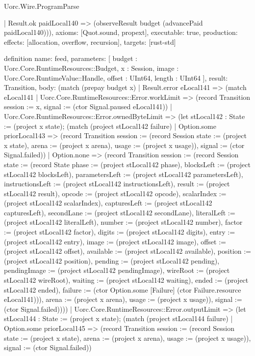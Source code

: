 \begin{lexlean}{Uorc.Wire.ProgramParse}
\begin{semanticmodule}
{    | Result.ok paidLocal140 => (observeResult budget (advancePaid paidLocal140))),
  axioms: [Quot.sound, propext],
  executable: true,
  production: {effects: [allocation, overflow, recursion], targets: [rust-std]}
}

definition{
  name: feed,
  parameters: [
    budget : Uorc.Core.RuntimeResources::Budget,
    x : Session,
    image : Uorc.Core.RuntimeValue::Handle,
    offset : UInt64,
    length : UInt64
  ],
  result: Transition,
  body: (match (prepay budget x)
    | Result.error eLocal141 => (match eLocal141
      | Uorc.Core.RuntimeResources::Error.workLimit => (record Transition {session := x, signal := (ctor Signal.paused eLocal141)})
      | Uorc.Core.RuntimeResources::Error.ownedByteLimit => (let stLocal142 : State := (project x state); (match (project stLocal142 failure)
        | Option.some priorLocal143 => (record Transition {session := (record Session {state := (project x state), arena := (project x arena), usage := (project x usage)}), signal := (ctor Signal.failed)})
        | Option.none => (record Transition {session := (record Session {state := (record State {phase := (project stLocal142 phase), blocksLeft := (project stLocal142 blocksLeft), parametersLeft := (project stLocal142 parametersLeft), instructionsLeft := (project stLocal142 instructionsLeft), result := (project stLocal142 result), opcode := (project stLocal142 opcode), scalarIndex := (project stLocal142 scalarIndex), capturesLeft := (project stLocal142 capturesLeft), secondLane := (project stLocal142 secondLane), literalLeft := (project stLocal142 literalLeft), number := (project stLocal142 number), factor := (project stLocal142 factor), digits := (project stLocal142 digits), entry := (project stLocal142 entry), image := (project stLocal142 image), offset := (project stLocal142 offset), available := (project stLocal142 available), position := (project stLocal142 position), pending := (project stLocal142 pending), pendingImage := (project stLocal142 pendingImage), wireRoot := (project stLocal142 wireRoot), waiting := (project stLocal142 waiting), ended := (project stLocal142 ended), failure := (ctor Option.some [Failure] (ctor Failure.resource eLocal141))}), arena := (project x arena), usage := (project x usage)}), signal := (ctor Signal.failed)})))
      | Uorc.Core.RuntimeResources::Error.outputLimit => (let stLocal144 : State := (project x state); (match (project stLocal144 failure)
        | Option.some priorLocal145 => (record Transition {session := (record Session {state := (project x state), arena := (project x arena), usage := (project x usage)}), signal := (ctor Signal.failed)})
}
\end{semanticmodule}
\end{lexlean}

